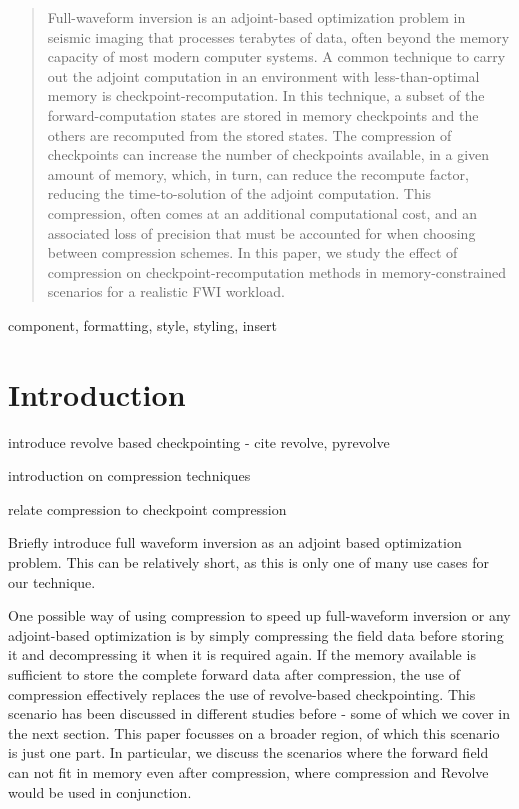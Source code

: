 \documentclass[conference]{IEEEtran}
\begin{document}
\begin{abstract}
Full-waveform inversion is an adjoint-based optimization problem in
seismic imaging that processes terabytes of data, often beyond the
memory capacity of most modern computer systems. A common technique to
carry out the adjoint computation in an environment with
less-than-optimal memory is checkpoint-recomputation. In this
technique, a subset of the forward-computation states are stored in
memory checkpoints and the others are recomputed from the stored
states. The compression of checkpoints can increase the number of
checkpoints available, in a given amount of memory, which, in turn,
can reduce the recompute factor, reducing the time-to-solution of the
adjoint computation. This compression, often comes at an additional
computational cost, and an associated loss of precision that must be
accounted for when choosing between compression schemes. In this
paper, we study the effect of compression on checkpoint-recomputation
methods in memory-constrained scenarios for a realistic FWI workload.
\end{abstract}

\begin{IEEEkeywords}
component, formatting, style, styling, insert
\end{IEEEkeywords}

\section{Introduction}
introduce revolve based checkpointing - cite revolve, pyrevolve

introduction on compression techniques

relate compression to checkpoint compression

Briefly introduce full waveform inversion as an adjoint based optimization
problem. This can be relatively short, as this is only one of many use cases
for our technique.

One possible way of using compression to speed up full-waveform inversion or any adjoint-based
optimization is by simply compressing the field data before storing it and decompressing it when it
is required again. If the memory available is sufficient to store the complete forward data after
compression, the use of compression effectively replaces the use of revolve-based checkpointing.
This scenario has been discussed in different studies before - some of which we cover in the next
section. This paper focusses on a broader region, of which this scenario is just one part. In particular,
we discuss the scenarios where the forward field can not fit in memory even after compression, where
compression and Revolve would be used in conjunction. 
\end{document}
